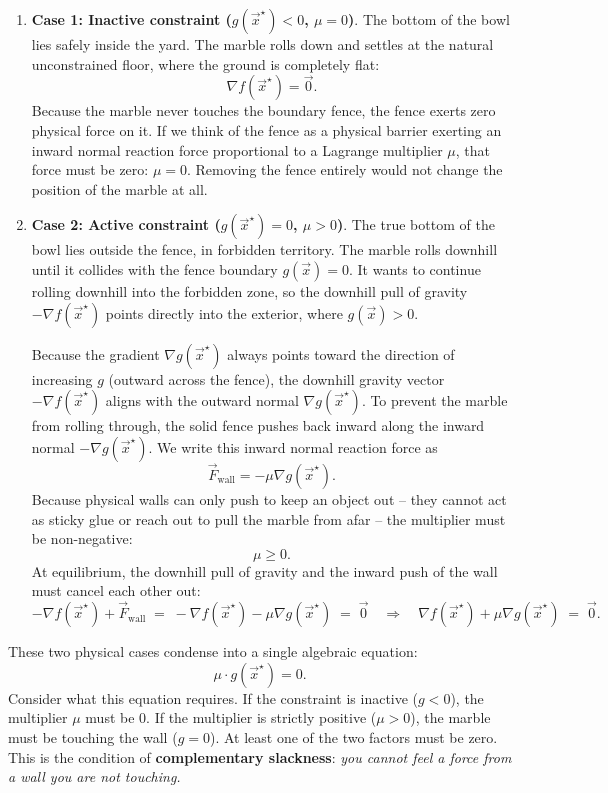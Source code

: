 \begin{enumerate}
  \item \textbf{Case 1: Inactive constraint ($g(\vec{x}^\star) < 0$, $\mu = 0$)}.
  The bottom of the bowl lies safely inside the yard. The marble rolls down and settles at the natural unconstrained floor, where the ground is completely flat:
  \[
    \nabla f(\vec{x}^\star) = \vec{0}.
  \]
  Because the marble never touches the boundary fence, the fence exerts zero physical force on it. If we think of the fence as a physical barrier exerting an inward normal reaction force proportional to a Lagrange multiplier $\mu$, that force must be zero: $\mu = 0$. Removing the fence entirely would not change the position of the marble at all.

  \item \textbf{Case 2: Active constraint ($g(\vec{x}^\star) = 0$, $\mu > 0$)}.
  The true bottom of the bowl lies outside the fence, in forbidden territory. The marble rolls downhill until it collides with the fence boundary $g(\vec{x}) = 0$. It wants to continue rolling downhill into the forbidden zone, so the downhill pull of gravity $-\nabla f(\vec{x}^\star)$ points directly into the exterior, where $g(\vec{x}) > 0$.

  Because the gradient $\nabla g(\vec{x}^\star)$ always points toward the direction of increasing $g$ (outward across the fence), the downhill gravity vector $-\nabla f(\vec{x}^\star)$ aligns with the outward normal $\nabla g(\vec{x}^\star)$. To prevent the marble from rolling through, the solid fence pushes back inward along the inward normal $-\nabla g(\vec{x}^\star)$. We write this inward normal reaction force as
  \[
    \vec{F}_{\text{wall}} = -\mu \nabla g(\vec{x}^\star).
  \]
  Because physical walls can only push to keep an object out -- they cannot act as sticky glue or reach out to pull the marble from afar -- the multiplier must be non-negative:
  \[
    \mu \ge 0.
  \]
  At equilibrium, the downhill pull of gravity and the inward push of the wall must cancel each other out:
  \[
    -\nabla f(\vec{x}^\star) + \vec{F}_{\text{wall}} \;=\; -\nabla f(\vec{x}^\star) - \mu \nabla g(\vec{x}^\star) \;=\; \vec{0}
    \quad\Longrightarrow\quad \nabla f(\vec{x}^\star) + \mu \nabla g(\vec{x}^\star) \;=\; \vec{0}.
  \]
\end{enumerate}

These two physical cases condense into a single algebraic equation:
\[
  \mu \cdot g(\vec{x}^\star) = 0.
\]
Consider what this equation requires. If the constraint is inactive ($g < 0$), the multiplier $\mu$ must be $0$. If the multiplier is strictly positive ($\mu > 0$), the marble must be touching the wall ($g = 0$). At least one of the two factors must be zero. This is the condition of \textbf{complementary slackness}: \emph{you cannot feel a force from a wall you are not touching.}

